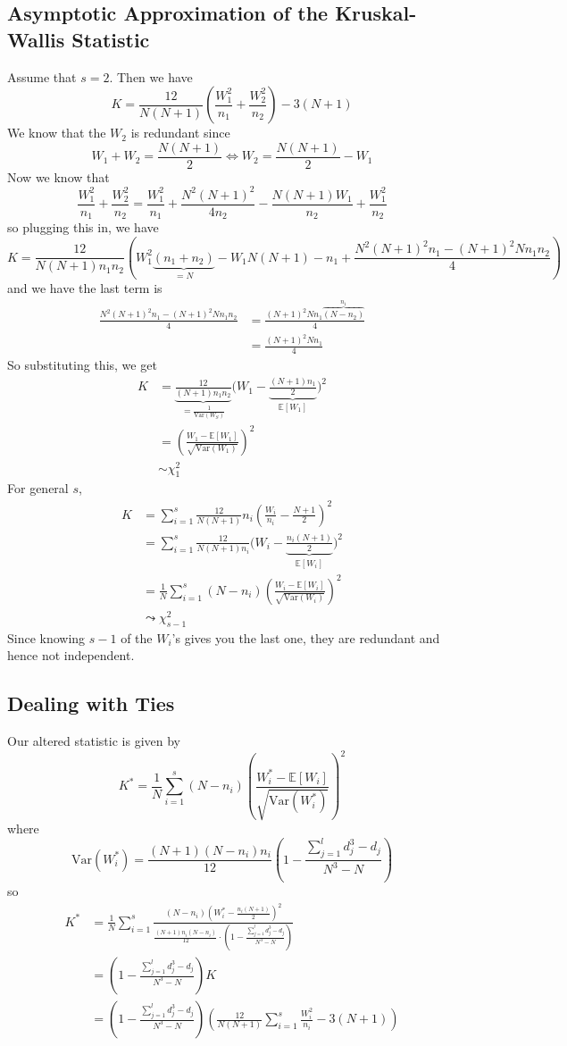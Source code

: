 \documentclass[a4paper,12pt]{amsart}
\newcommand{\Var}{\mbox{Var}}
\newcommand{\E}[1]{\mathbb{E}\left[#1\right]}
\begin{document}
\subsection{Asymptotic Approximation of the Kruskal-Wallis Statistic}
Assume that $s=2$. Then we have
\[K = \frac{12}{N(N+1)}\left(\frac{W_1^2}{n_1} + \frac{W_2^2}{n_2}\right) - 3(N+1)\]
We know that the $W_2$ is redundant since
\[W_1 + W_2 = \frac{N(N+1)}{2} \Leftrightarrow W_2 = \frac{N(N+1)}{2} - W_1\]
Now we know that
\[
\frac{W_1^2}{n_1} + \frac{W_2^2}{n_2} = \frac{W_1^2}{n_1} + \frac{N^2(N+1)^2}{4n_2} - \frac{N(N+1)W_1}{n_2} + \frac{W_1^2}{n_2}\]
so plugging this in, we have
\[K = \frac{12}{N(N+1)n_1n_2}\left(W_1^2\underbrace{(n_1 + n_2)}_{=N} - W_1N(N+1) - n_1 + \frac{N^2(N+1)^2n_1 - (N+1)^2N n_1 n_2}{4}\right)\]
and we have the last term is
\begin{align*}
\frac{N^2(N+1)^2n_1 - (N+1)^2N n_1 n_2}{4} &= \frac{(N+1)^2Nn_1\overbrace{(N-n_2)}^{n_1}}{4}\\
&= \frac{(N+1)^2Nn_1}{4}
\end{align*}
So substituting this, we get
\begin{align*}
K &= \underbrace{\frac{12}{(N+1)n_1n_2}}_{\displaystyle=\frac{1}{\Var(W_S)}}\bigg(W_1 - \underbrace{\frac{(N+1)n_1}{2}}_{\displaystyle \E{W_1}}\bigg)^2\\
&= \left(\frac{W_1 - \E{W_1}}{\sqrt{\Var(W_1)}}\right)^2\\
&\sim \chi^2_1
\end{align*}
For general $s$, 
\begin{align*}
K &= \sum_{i=1}^s \frac{12}{N(N+1)}n_i\left(\frac{W_i}{n_i} - \frac{N+1}{2}\right)^2 \\
&= \sum_{i=1}^s \frac{12}{N(N+1)n_i}\bigg(W_i - \underbrace{\frac{n_i(N+1)}{2}}_{\E{W_i}}\bigg)^2\\
&= \frac{1}{N}\sum_{i=1}^s(N-n_i) \left(\frac{W_i - \E{W_i}}{\sqrt{\Var(W_i)}}\right)^2\\
&\leadsto \chi^2_{s-1}
\end{align*}
Since knowing $s-1$ of the $W_i$'s gives you the last one, they are redundant and hence not independent.

\subsection{Dealing with Ties}
Our altered statistic is given by
\[K^* = \frac{1}{N}\sum_{i=1}^s(N-n_i) \left(\frac{W_i^* - \E{W_i}}{\sqrt{\Var(W_i^*)}}\right)^2\]
where
\[\Var(W_i^*) = \frac{(N+1)(N-n_i)n_i}{12}\left(1 - \frac{\sum_{j=1}^l d_j^3 - d_j}{N^3 - N}\right)\]
so
\begin{align*}
K^* &= \frac{1}{N}\sum_{i=1}^s \frac{(N-n_i)\left(W_i^* - \frac{n_i(N+1)}{2}\right)^2}{\frac{(N+1)n_i(N-n_i)}{12} \cdot \left(1 - \frac{\sum_{j=1}^l d_j^3 - d_j}{N^3 - N}\right)}\\
&= \left(1 - \frac{\sum_{j=1}^l d_j^3 - d_j}{N^3 - N} \right)K\\
&= \left(1 - \frac{\sum_{j=1}^l d_j^3 - d_j}{N^3 - N} \right) \left(\frac{12}{N(N+1)}\sum_{i=1}^s \frac{W_i^2}{n_i} - 3(N+1)\right)
\end{align*}
\end{document}
